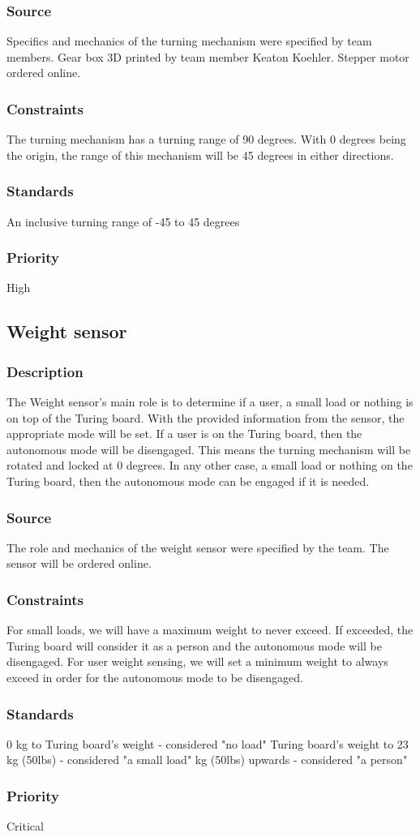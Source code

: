 \subsubsection{Source}
Specifics and mechanics of the turning mechanism were specified by team members.\hfill \break
Gear box 3D printed by team member Keaton Koehler.\hfill \break
Stepper motor ordered online.
\subsubsection{Constraints}
The turning mechanism has a turning range of 90 degrees. With 0 degrees being the origin, the range of this mechanism will be 45 degrees in either directions.
\subsubsection{Standards}
An inclusive turning range of -45 to 45 degrees
\subsubsection{Priority}
High
\subsection{Weight sensor}
\subsubsection{Description}
The Weight sensor's main role is to determine if a user, a small load or nothing is on top of the Turing board. With the provided information from the sensor, the appropriate mode will be set. If a user is on the Turing board, then the autonomous mode will be disengaged. This means the turning mechanism will be rotated and locked at 0 degrees. In any other case, a small load or nothing on the Turing board, then the autonomous mode can be engaged if it is needed. 
\subsubsection{Source}
The role and mechanics of the weight sensor were specified by the team. \hfill \break 
The sensor will be ordered online.
\subsubsection{Constraints}
For small loads, we will have a maximum weight to never exceed. If exceeded, the Turing board will consider it as a person and the autonomous mode will be disengaged. \hfill \break
For user weight sensing, we will set a minimum weight to always exceed in order for the autonomous mode to be disengaged.
\subsubsection{Standards}
0 kg to Turing board's weight - considered "no load" \hfill \break
Turing board's weight to 23 kg (50lbs) - considered "a small load" \hfill {} kg (50lbs) upwards - considered "a person"
\subsubsection{Priority}
Critical